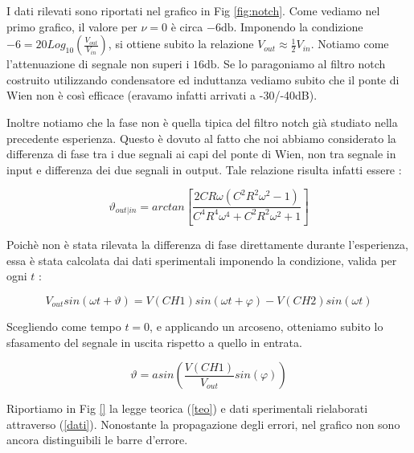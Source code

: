 I dati rilevati sono riportati nel grafico in Fig \ref{fig:notch}. Come vediamo nel primo grafico, il valore per $\nu=0$ è circa $-6 \si{\decibel}$. Imponendo la condizione $-6=20Log_{10}(\frac{V_{out}}{V_{in}})$, si ottiene subito la relazione $V_{out} \approx \frac{1}{2} V_{in}$. Notiamo come l'attenuazione di segnale non superi i $16 \si{\decibel}$. Se lo paragoniamo al filtro notch costruito utilizzando condensatore ed induttanza vediamo subito che il ponte di Wien non è così efficace (eravamo infatti arrivati a -30/-40dB). 

\newpage


Inoltre notiamo che la fase non è quella tipica del filtro notch già studiato nella precedente esperienza. Questo è dovuto al fatto che noi abbiamo considerato la differenza di fase tra i due segnali ai capi del ponte di Wien, non tra segnale in input e differenza dei due segnali in output. Tale relazione risulta infatti essere :

\begin{equation}
\vartheta_{out|in}=arctan[\frac{2 C R \omega \left(C^2 R^2 \omega^2-1\right)}{C^4 R^4 \omega^4+C^2 R^2 \omega^2+1}]
\label{teo}
\end{equation}



Poichè non è stata rilevata la differenza di fase direttamente durante l'esperienza, essa è stata calcolata dai dati sperimentali imponendo la condizione, valida per ogni $t$ :

\begin{equation}
V_{out}sin(\omega t + \vartheta)=V(CH1)sin(\omega t + \varphi)-V(CH2)sin(\omega t)
\end{equation}

Scegliendo come tempo $t=0$, e applicando un arcoseno, otteniamo subito lo sfasamento del segnale in uscita rispetto a quello in entrata.

\begin{equation}
\vartheta=asin(\frac{V(CH1)}{V_{out}}sin(\varphi))
\label{dati}
\end{equation}


Riportiamo in Fig \ref{} la legge teorica (\ref{teo}) e dati sperimentali rielaborati attraverso (\ref{dati}). Nonostante la propagazione degli errori, nel grafico non sono ancora distinguibili le barre d'errore.




